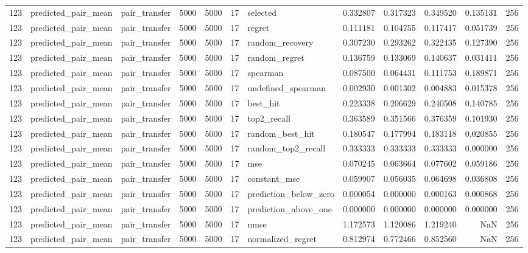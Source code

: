 \begin{tabular}{rllrrrlrrrrr}
123 & predicted_pair_mean & pair_transfer & 5000 & 5000 & 17 & selected & 0.332807 & 0.317323 & 0.349520 & 0.135131 & 256 \\
123 & predicted_pair_mean & pair_transfer & 5000 & 5000 & 17 & regret & 0.111181 & 0.104755 & 0.117417 & 0.051739 & 256 \\
123 & predicted_pair_mean & pair_transfer & 5000 & 5000 & 17 & random_recovery & 0.307230 & 0.293262 & 0.322435 & 0.127390 & 256 \\
123 & predicted_pair_mean & pair_transfer & 5000 & 5000 & 17 & random_regret & 0.136759 & 0.133069 & 0.140637 & 0.031411 & 256 \\
123 & predicted_pair_mean & pair_transfer & 5000 & 5000 & 17 & spearman & 0.087500 & 0.064431 & 0.111753 & 0.189871 & 256 \\
123 & predicted_pair_mean & pair_transfer & 5000 & 5000 & 17 & undefined_spearman & 0.002930 & 0.001302 & 0.004883 & 0.015378 & 256 \\
123 & predicted_pair_mean & pair_transfer & 5000 & 5000 & 17 & best_hit & 0.223338 & 0.206629 & 0.240508 & 0.140785 & 256 \\
123 & predicted_pair_mean & pair_transfer & 5000 & 5000 & 17 & top2_recall & 0.363589 & 0.351566 & 0.376359 & 0.101930 & 256 \\
123 & predicted_pair_mean & pair_transfer & 5000 & 5000 & 17 & random_best_hit & 0.180547 & 0.177994 & 0.183118 & 0.020855 & 256 \\
123 & predicted_pair_mean & pair_transfer & 5000 & 5000 & 17 & random_top2_recall & 0.333333 & 0.333333 & 0.333333 & 0.000000 & 256 \\
123 & predicted_pair_mean & pair_transfer & 5000 & 5000 & 17 & mse & 0.070245 & 0.063664 & 0.077602 & 0.059186 & 256 \\
123 & predicted_pair_mean & pair_transfer & 5000 & 5000 & 17 & constant_mse & 0.059907 & 0.056035 & 0.064698 & 0.036808 & 256 \\
123 & predicted_pair_mean & pair_transfer & 5000 & 5000 & 17 & prediction_below_zero & 0.000054 & 0.000000 & 0.000163 & 0.000868 & 256 \\
123 & predicted_pair_mean & pair_transfer & 5000 & 5000 & 17 & prediction_above_one & 0.000000 & 0.000000 & 0.000000 & 0.000000 & 256 \\
123 & predicted_pair_mean & pair_transfer & 5000 & 5000 & 17 & nmse & 1.172573 & 1.120086 & 1.219240 & NaN & 256 \\
123 & predicted_pair_mean & pair_transfer & 5000 & 5000 & 17 & normalized_regret & 0.812974 & 0.772466 & 0.852560 & NaN & 256 \\

\end{tabular}
